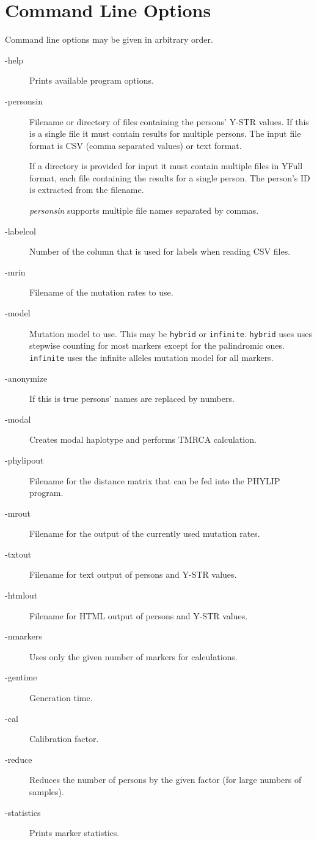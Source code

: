\section{Command Line Options}

Command line options may be given in arbitrary order.

\begin{description}
\item[-help] Prints available program options.
\item[-personsin] Filename or directory of files containing the
	persons' Y-STR values. If this is a single file it must contain
	results for multiple persons. The input file format is CSV
    (comma separated values) or text format.

	If a directory is provided for input it must contain multiple
	files in YFull format, each file containing the results for
	a single person. The person's ID is extracted from the filename.

	\emph{personsin} supports multiple file names separated by
	commas.
\item[-labelcol] Number of the column that is used for labels
	when reading CSV files.
\item[-mrin] Filename of the mutation rates to use.
\item[-model] Mutation model to use. This may be \texttt{hybrid}
	or \texttt{infinite}. \texttt{hybrid} uses uses stepwise counting
	for most markers except for the palindromic ones. 
	\texttt{infinite} uses the infinite alleles mutation model for
	all markers.
\item[-anonymize] If this is true persons' names are replaced by numbers.
\item[-modal] Creates modal haplotype and performs TMRCA calculation.
\item[-phylipout] Filename for the distance matrix that can be fed into
	the PHYLIP\cite{Phylip} program.
\item[-mrout] Filename for the output of the currently used mutation rates.
\item[-txtout] Filename for text output of persons and Y-STR values.
\item[-htmlout] Filename for HTML output of persons and Y-STR values.
\item[-nmarkers] Uses only the given number of markers for calculations.
\item[-gentime] Generation time.
\item[-cal] Calibration factor.
\item[-reduce] Reduces the number of persons by the given factor
	 (for large numbers of samples).
\item[-statistics] Prints marker statistics.
\end{description}

